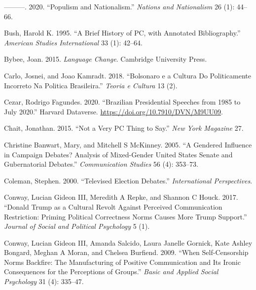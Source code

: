 \documentclass[smallextended]{svjour3}       %
\newlength{\cslhangindent}
\newlength{\cslentryspacingunit} %
\newenvironment{CSLReferences}[2] %
 {%
  \setlength{\parindent}{0pt}
  \ifodd #1
  \let\oldpar\par
  \def\par{\hangindent=\cslhangindent\oldpar}
  \fi
  \setlength{\parskip}{#2\cslentryspacingunit}
 }%
 {}
\begin{document}
\begin{CSLReferences}{1}{0}
\leavevmode{}%
---------. 2020. {``Populism and Nationalism.''} \emph{Nations and
Nationalism} 26 (1): 44--66.

\leavevmode{}%
Bush, Harold K. 1995. {``A Brief History of PC, with Annotated
Bibliography.''} \emph{American Studies International} 33 (1): 42--64.

\leavevmode{}%
Bybee, Joan. 2015. \emph{Language Change}. Cambridge University Press.

\leavevmode{}%
Carlo, Josnei, and Joao Kamradt. 2018. {``Bolsonaro e a Cultura Do
Politicamente Incorreto Na Politica Brasileira.''} \emph{Teoria e
Cultura} 13 (2).

\leavevmode{}%
Cezar, Rodrigo Fagundes. 2020. {``Brazilian Presidential Speeches from
1985 to July 2020.''} Harvard Dataverse.
\url{https://doi.org/10.7910/DVN/M9UU09}.

\leavevmode{}%
Chait, Jonathan. 2015. {``Not a Very PC Thing to Say.''} \emph{New York
Magazine} 27.

\leavevmode{}%
Christine Banwart, Mary, and Mitchell S McKinney. 2005. {``A Gendered
Influence in Campaign Debates? Analysis of Mixed-Gender United States
Senate and Gubernatorial Debates.''} \emph{Communication Studies} 56
(4): 353--73.

\leavevmode{}%
Coleman, Stephen. 2000. {``Televised Election Debates.''}
\emph{International Perspectives}.

\leavevmode{}%
Conway, Lucian Gideon III, Meredith A Repke, and Shannon C Houck. 2017.
{``Donald Trump as a Cultural Revolt Against Perceived Communication
Restriction: Priming Political Correctness Norms Causes More Trump
Support.''} \emph{Journal of Social and Political Psychology} 5 (1).

\leavevmode{}%
Conway, Lucian Gideon III, Amanda Salcido, Laura Janelle Gornick, Kate
Ashley Bongard, Meghan A Moran, and Chelsea Burfiend. 2009. {``When
Self-Censorship Norms Backfire: The Manufacturing of Positive
Communication and Its Ironic Consequences for the Perceptions of
Groups.''} \emph{Basic and Applied Social Psychology} 31 (4): 335--47.


\end{CSLReferences}
\end{document}
